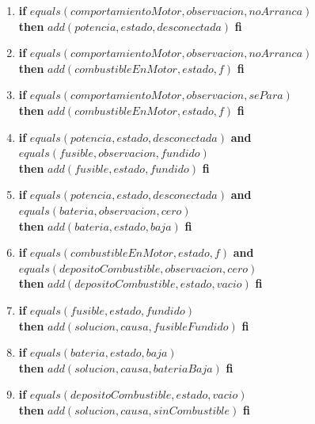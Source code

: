 \documentclass[10pt, a4paper,spanish]{article}
\begin{document}
		\begin{enumerate}[label={\textbf{R\theenumi:}}]
			\item
				\textbf{if} $equals(comportamientoMotor, observacion, noArranca)$ \\
				\textbf{then} $add(potencia, estado, desconectada)$ \textbf{fi}

			\item
				\textbf{if} $equals(comportamientoMotor, observacion, noArranca)$ \\
				\textbf{then} $add(combustibleEnMotor, estado, f)$ \textbf{fi}

			\item
				\textbf{if} $equals(comportamientoMotor, observacion, sePara)$ \\
				\textbf{then} $add(combustibleEnMotor, estado, f)$ \textbf{fi}

			\item
				\textbf{if} $equals(potencia, estado, desconectada)$ \textbf{and} $equals(fusible, observacion, fundido)$ \\
				\textbf{then} $add(fusible, estado, fundido)$ \textbf{fi}

			\item
				\textbf{if} $equals(potencia, estado, desconectada)$ \textbf{and} $equals(bateria, observacion, cero)$ \\
				\textbf{then} $add(bateria, estado, baja)$ \textbf{fi}

			\item
				\textbf{if} $equals(combustibleEnMotor, estado, f)$ \textbf{and} $equals(depositoCombustible, observacion, cero)$ \\
				\textbf{then} $add(depositoCombustible, estado, vacio)$ \textbf{fi}

			\item
				\textbf{if} $equals(fusible, estado, fundido)$ \\
				\textbf{then} $add(solucion, causa, fusibleFundido)$ \textbf{fi}

			\item
				\textbf{if} $equals(bateria, estado, baja)$ \\
				\textbf{then} $add(solucion, causa, bateriaBaja)$ \textbf{fi}

			\item
				\textbf{if} $equals(depositoCombustible, estado, vacio)$ \\
				\textbf{then} $add(solucion, causa, sinCombustible)$ \textbf{fi}

		\end{enumerate}
\end{document}
